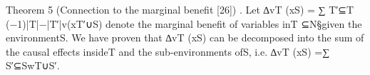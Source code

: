 Theorem 5 (Connection to the marginal beneﬁt [26]) . Let ∆vT (xS) = ∑
T′⊆T (−1)|T|−|T′|v(xT′∪S) denote the marginal
beneﬁt of variables inT ⊆N\S given the environmentS. We have proven that ∆vT (xS) can be decomposed into the sum of
the causal effects insideT and the sub-environments ofS, i.e. ∆vT (xS) =∑
S′⊆SwT∪S′.
